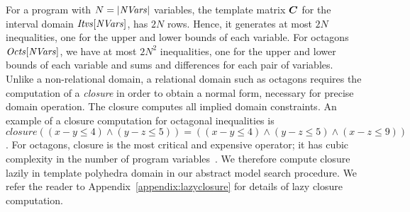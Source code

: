 %
%
For a program with $N=|\mathit{NVars}|$ variables, the template 
matrix ${\boldsymbol C}$ for the interval domain $\mathit{Itvs}[\mathit{NVars}]$, 
has $2N$ rows. Hence, it generates at most $2N$ inequalities, one
for the upper and lower bounds of each variable.
%
For octagons $\mathit{Octs}[\mathit{NVars}]$, we have at most $2N^2$
inequalities, one for the upper and lower bounds of each variable and
sums and differences for each pair of variables. 
%
Unlike a non-relational domain, a relational domain such as octagons 
requires the computation of a \emph{closure} in order to obtain a normal 
form, necessary for precise domain operation. 
The closure computes all implied domain constraints.  
An example of a closure computation for octagonal inequalities is
$\mathit{closure}((x-y \leq 4) \wedge (y-z \leq 5))=((x-y \leq 4) \wedge (y-z
\leq 5) \wedge (x-z \leq 9))$.
%
For octagons, closure is the most critical and expensive operator; it has  
cubic complexity in the number of program variables~\cite{pldi15}.  
We therefore compute closure lazily in template polyhedra domain in our abstract 
model search procedure. We refer the reader to Appendix~\ref{appendix:lazyclosure} 
for details of lazy closure computation. 

%

